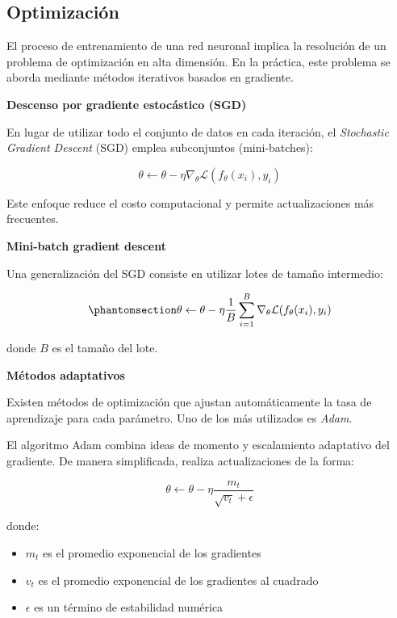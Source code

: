 \documentclass[
  spanish,
  us-letterpaper,
  DIV=11,
  numbers=noendperiod]{scrreprt}
\providecommand{\tightlist}{%
  \setlength{\itemsep}{0pt}\setlength{\parskip}{0pt}}
\begin{document}
\subsection{Optimización}\label{optimizaciuxf3n}

El proceso de entrenamiento de una red neuronal implica la resolución de
un problema de optimización en alta dimensión. En la práctica, este
problema se aborda mediante métodos iterativos basados en gradiente.

\textbf{Descenso por gradiente estocástico (SGD)}

En lugar de utilizar todo el conjunto de datos en cada iteración, el
\emph{Stochastic Gradient Descent} (SGD) emplea subconjuntos
(mini-batches):

\[
\theta \leftarrow \theta - \eta \nabla_{\theta} \mathcal{L}(f_\theta(x_i), y_i)
\]

Este enfoque reduce el costo computacional y permite actualizaciones más
frecuentes.

\textbf{Mini-batch gradient descent}

Una generalización del SGD consiste en utilizar lotes de tamaño
intermedio:

\begin{equation}\phantomsection\label{eq-minibatch}{
\theta \leftarrow \theta - \eta \frac{1}{B} \sum_{i=1}^{B} \nabla_{\theta} \mathcal{L}(f_\theta(x_i), y_i)
}\end{equation}

donde \(B\) es el tamaño del lote.

\textbf{Métodos adaptativos}

Existen métodos de optimización que ajustan automáticamente la tasa de
aprendizaje para cada parámetro. Uno de los más utilizados es
\emph{Adam}.

El algoritmo Adam combina ideas de momento y escalamiento adaptativo del
gradiente. De manera simplificada, realiza actualizaciones de la forma:

\[
\theta \leftarrow \theta - \eta \frac{m_t}{\sqrt{v_t} + \epsilon}
\]

donde:

\begin{itemize}
\tightlist
\item
  \(m_t\) es el promedio exponencial de los gradientes\\
\item
  \(v_t\) es el promedio exponencial de los gradientes al cuadrado\\
\item
  \(\epsilon\) es un término de estabilidad numérica
\end{itemize}
\end{document}
